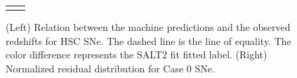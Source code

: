 \documentclass[proof]{pasj01}
\providecommand{\DIFadd}[1]{{\protect\color{blue} \sf #1}} %
\providecommand{\DIFdel}[1]{{\protect\color{red} \scriptsize #1}} %
\providecommand{\DIFaddFL}[1]{\DIFadd{#1}} %
\providecommand{\DIFdelFL}[1]{\DIFdel{#1}} %
\providecommand{\DIFaddbeginFL}{} %
\providecommand{\DIFaddendFL}{} %
\providecommand{\DIFdelbeginFL}{} %
\providecommand{\DIFdelendFL}{} %
\newcommand{\DIFscaledelfig}{0.5}
\newlength{\DIFdelgraphicswidth} %
\newlength{\DIFdelgraphicsheight} %
\newcommand{\DIFaddincludegraphics}[2][]{{\color{blue}\fbox{\DIFOincludegraphics[#1]{#2}}}} %
\newcommand{\DIFdelincludegraphics}[2][]{%
\sbox{\DIFdelgraphicsbox}{\DIFOincludegraphics[#1]{#2}}%
\settoboxwidth{\DIFdelgraphicswidth}{\DIFdelgraphicsbox} %
\settoboxtotalheight{\DIFdelgraphicsheight}{\DIFdelgraphicsbox} %
\scalebox{\DIFscaledelfig}{%
\parbox[b]{\DIFdelgraphicswidth}{\usebox{\DIFdelgraphicsbox}\\[-\baselineskip] \rule{\DIFdelgraphicswidth}{0em}}\llap{\resizebox{\DIFdelgraphicswidth}{\DIFdelgraphicsheight}{%
\setlength{\unitlength}{\DIFdelgraphicswidth}%
\begin{picture}(1,1)%
\thicklines\linethickness{2pt} %
{\color[rgb]{1,0,0}\put(0,0){\framebox(1,1){}}}%
{\color[rgb]{1,0,0}\put(0,0){\line( 1,1){1}}}%
{\color[rgb]{1,0,0}\put(0,1){\line(1,-1){1}}}%
\end{picture}%
}\hspace*{3pt}}} %
} %
\DeclareRobustCommand{\DIFaddbeginFL}{\DIFOaddbeginFL \let\includegraphics\DIFaddincludegraphics} %
\DeclareRobustCommand{\DIFaddendFL}{\DIFOaddendFL \let\includegraphics\DIFOincludegraphics} %
\DeclareRobustCommand{\DIFdelbeginFL}{\DIFOdelbeginFL \let\includegraphics\DIFdelincludegraphics} %
\DeclareRobustCommand{\DIFdelendFL}{\DIFOaddendFL \let\includegraphics\DIFOincludegraphics} %
\begin{document}
\begin{figure}[htbp]
\begin{tabular}{cc}
\begin{minipage}{0.5\hsize}
\begin{center}
            \end{center}
        \end{minipage}
    \end{tabular}  \caption{%
    (Left) Relation between the machine predictions and the observed redshifts for HSC SNe.
    The dashed line is the line of equality.
    The color difference represents \DIFaddbeginFL \DIFaddFL{the }\DIFaddendFL SALT2 \DIFdelbeginFL \DIFdelFL{fit }\DIFdelendFL \DIFaddbeginFL \DIFaddFL{fitted }\DIFaddendFL label.
    (Right) Normalized residual distribution for Case 0 SNe.
    }%
    \label{fig:redshift_estimation}
\end{figure}

%


%
\end{document}
